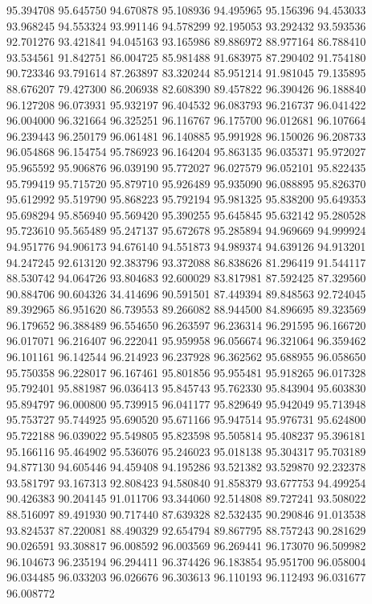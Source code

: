 95.394708
95.645750
94.670878
95.108936
94.495965
95.156396
94.453033
93.968245
94.553324
93.991146
94.578299
92.195053
93.292432
93.593536
92.701276
93.421841
94.045163
93.165986
89.886972
88.977164
86.788410
93.534561
91.842751
86.004725
85.981488
91.683975
87.290402
91.754180
90.723346
93.791614
87.263897
83.320244
85.951214
91.981045
79.135895
88.676207
79.427300
86.206938
82.608390
89.457822
96.390426
96.188840
96.127208
96.073931
95.932197
96.404532
96.083793
96.216737
96.041422
96.004000
96.321664
96.325251
96.116767
96.175700
96.012681
96.107664
96.239443
96.250179
96.061481
96.140885
95.991928
96.150026
96.208733
96.054868
96.154754
95.786923
96.164204
95.863135
96.035371
95.972027
95.965592
95.906876
96.039190
95.772027
96.027579
96.052101
95.822435
95.799419
95.715720
95.879710
95.926489
95.935090
96.088895
95.826370
95.612992
95.519790
95.868223
95.792194
95.981325
95.838200
95.649353
95.698294
95.856940
95.569420
95.390255
95.645845
95.632142
95.280528
95.723610
95.565489
95.247137
95.672678
95.285894
94.969669
94.999924
94.951776
94.906173
94.676140
94.551873
94.989374
94.639126
94.913201
94.247245
92.613120
92.383796
93.372088
86.838626
81.296419
91.544117
88.530742
94.064726
93.804683
92.600029
83.817981
87.592425
87.329560
90.884706
90.604326
34.414696
90.591501
87.449394
89.848563
92.724045
89.392965
86.951620
86.739553
89.266082
88.944500
84.896695
89.323569
96.179652
96.388489
96.554650
96.263597
96.236314
96.291595
96.166720
96.017071
96.216407
96.222041
95.959958
96.056674
96.321064
96.359462
96.101161
96.142544
96.214923
96.237928
96.362562
95.688955
96.058650
95.750358
96.228017
96.167461
95.801856
95.955481
95.918265
96.017328
95.792401
95.881987
96.036413
95.845743
95.762330
95.843904
95.603830
95.894797
96.000800
95.739915
96.041177
95.829649
95.942049
95.713948
95.753727
95.744925
95.690520
95.671166
95.947514
95.976731
95.624800
95.722188
96.039022
95.549805
95.823598
95.505814
95.408237
95.396181
95.166116
95.464902
95.536076
95.246023
95.018138
95.304317
95.703189
94.877130
94.605446
94.459408
94.195286
93.521382
93.529870
92.232378
93.581797
93.167313
92.808423
94.580840
91.858379
93.677753
94.499254
90.426383
90.204145
91.011706
93.344060
92.514808
89.727241
93.508022
88.516097
89.491930
90.717440
87.639328
82.532435
90.290846
91.013538
93.824537
87.220081
88.490329
92.654794
89.867795
88.757243
90.281629
90.026591
93.308817
96.008592
96.003569
96.269441
96.173070
96.509982
96.104673
96.235194
96.294411
96.374426
96.183854
95.951700
96.058004
96.034485
96.033203
96.026676
96.303613
96.110193
96.112493
96.031677
96.008772
